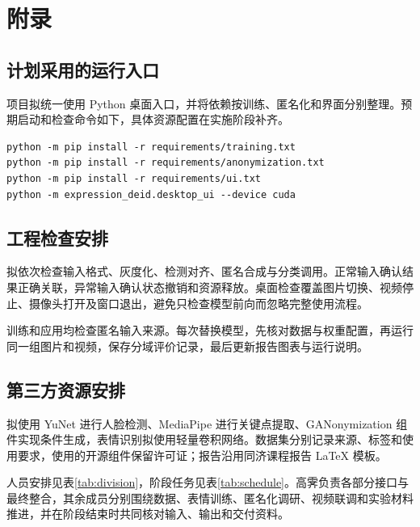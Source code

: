 \appendix
\section{附录}
\label{sec:appendix}
\subsection{计划采用的运行入口}
项目拟统一使用 Python 桌面入口，并将依赖按训练、匿名化和界面分别整理。预期启动和检查命令如下，具体资源配置在实施阶段补齐。
\begin{lstlisting}[language={},basicstyle=\ttfamily\small,breaklines=true,frame=none]
python -m pip install -r requirements/training.txt
python -m pip install -r requirements/anonymization.txt
python -m pip install -r requirements/ui.txt
python -m expression_deid.desktop_ui --device cuda
\end{lstlisting}

\subsection{工程检查安排}
拟依次检查输入格式、灰度化、检测对齐、匿名合成与分类调用。正常输入确认结果正确关联，异常输入确认状态撤销和资源释放。桌面检查覆盖图片切换、视频停止、摄像头打开及窗口退出，避免只检查模型前向而忽略完整使用流程。

训练和应用均检查匿名输入来源。每次替换模型，先核对数据与权重配置，再运行同一组图片和视频，保存分域评价记录，最后更新报告图表与运行说明。

\subsection{第三方资源安排}
拟使用 YuNet 进行人脸检测、MediaPipe 进行关键点提取、GANonymization 组件实现条件生成，表情识别拟使用轻量卷积网络。数据集分别记录来源、标签和使用要求，使用的开源组件保留许可证；报告沿用同济课程报告 LaTeX 模板。

人员安排见表\ref{tab:division}，阶段任务见表\ref{tab:schedule}。高霁负责各部分接口与最终整合，其余成员分别围绕数据、表情训练、匿名化调研、视频联调和实验材料推进，并在阶段结束时共同核对输入、输出和交付资料。
